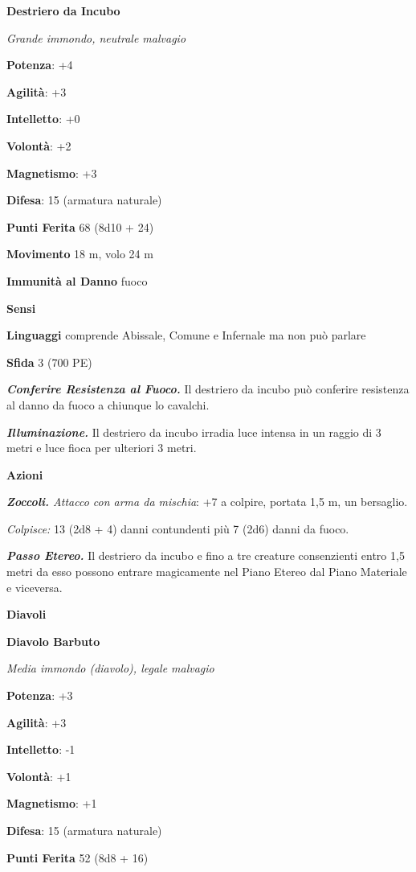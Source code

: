 \begin{multicols}{2}
\textbf{Destriero da Incubo}

\emph{Grande immondo, neutrale malvagio}

\textbf{Potenza}: +4

\textbf{Agilità}: +3

\textbf{Intelletto}: +0

\textbf{Volontà}: +2

\textbf{Magnetismo}: +3

\textbf{Difesa}: 15 (armatura naturale)

\textbf{Punti Ferita} 68 (8d10 + 24)

\textbf{Movimento} 18 m, volo 24 m

\textbf{Immunità al Danno} fuoco

\textbf{Sensi} 

\textbf{Linguaggi} comprende Abissale, Comune e Infernale ma non può
parlare

\textbf{Sfida} 3 (700 PE)

\emph{\textbf{Conferire Resistenza al Fuoco.}} Il destriero da incubo
può conferire resistenza al danno da fuoco a chiunque lo cavalchi.

\emph{\textbf{Illuminazione.}} Il destriero da incubo irradia luce
intensa in un raggio di 3 metri e luce fioca per ulteriori 3 metri.

\textbf{Azioni}

\emph{\textbf{Zoccoli.} Attacco con arma da mischia}: +7 a colpire,
portata 1,5 m, un bersaglio.

\emph{Colpisce:} 13 (2d8 + 4) danni contundenti più 7 (2d6) danni da
fuoco.

\emph{\textbf{Passo Etereo.}} Il destriero da incubo e fino a tre
creature consenzienti entro 1,5 metri da esso possono entrare
magicamente nel Piano Etereo dal Piano Materiale e viceversa.

\textbf{Diavoli}

\textbf{Diavolo Barbuto}

\emph{Media immondo (diavolo), legale malvagio}

\textbf{Potenza}: +3

\textbf{Agilità}: +3

\textbf{Intelletto}: -1

\textbf{Volontà}: +1

\textbf{Magnetismo}: +1

\textbf{Difesa}: 15 (armatura naturale)

\textbf{Punti Ferita} 52 (8d8 + 16)


\end{multicols}
